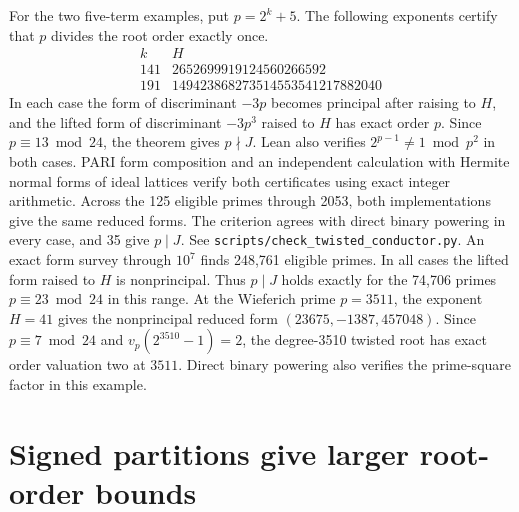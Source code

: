 \documentclass[11pt]{article}
\begin{document}
For the two five-term examples, put \(p=2^k+5\). The following
exponents certify that \(p\) divides the root order exactly once.
\[
\begin{array}{r|r}
k&H\\\hline
141&2652699919124560266592\\
191&149423868273514553541217882040
\end{array}
\]
In each case the form of discriminant \(-3p\) becomes principal
after raising to \(H\), and the lifted form of discriminant \(-3p^3\)
raised to \(H\) has exact order \(p\). Since \(p\equiv13\bmod24\),
the theorem gives \(p\nmid J\). Lean also verifies
\(2^{p-1}\ne1\bmod p^2\) in both cases. PARI form composition and
an independent calculation with Hermite normal forms of ideal lattices
verify both certificates using exact integer arithmetic.
Across the 125 eligible primes through 2053, both implementations
give the same reduced forms. The criterion agrees with direct
binary powering in every case, and 35 give \(p\mid J\). See
\nolinkurl{scripts/check_twisted_conductor.py}.
An exact form survey through \(10^7\) finds 248,761 eligible
primes. In all cases the lifted form raised to \(H\) is
nonprincipal. Thus \(p\mid J\) holds exactly for the 74,706
primes \(p\equiv23\bmod24\) in this range.
At the Wieferich prime \(p=3511\), the exponent \(H=41\) gives the
nonprincipal reduced form \((23675,-1387,457048)\). Since \(p\equiv7
\bmod24\) and \(v_p(2^{3510}-1)=2\), the degree-3510 twisted root
has exact order valuation two at \(3511\). Direct binary powering
also verifies the prime-square factor in this example.

\clearpage
\section{Signed partitions give larger root-order bounds}
\label{sec:twisted-partition-order}
\end{document}
